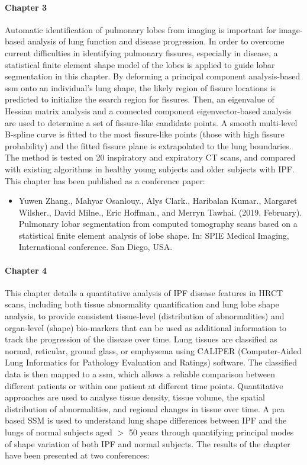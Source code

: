 \paragraph{Chapter 3} Automatic identification of pulmonary lobes from imaging is important for image-based analysis of lung function and disease progression. In order to overcome current difficulties in identifying pulmonary fissures, especially in disease, a statistical finite element shape model of the lobes is applied to guide lobar segmentation in this chapter. By deforming a principal component analysis-based \gls{ssm} onto an individual’s lung shape, the likely region of fissure locations is predicted to initialize the search region for fissures. Then, an eigenvalue of Hessian matrix analysis and a connected component eigenvector-based analysis are used to determine a set of fissure-like candidate points. A smooth multi-level B-spline curve is fitted to the most fissure-like points (those with high fissure probability) and the fitted fissure plane is extrapolated to the lung boundaries. The method is tested on 20 inspiratory and expiratory CT scans, and compared with existing algorithms in healthy young subjects and older subjects with IPF. This chapter has been published as a conference paper:

\begin{itemize}
  \item Yuwen Zhang., Mahyar Osanlouy., Alys Clark., Haribalan Kumar., Margaret Wilsher., David Milne., Eric Hoffman., and  Merryn Tawhai. (2019, February). Pulmonary lobar segmentation from computed tomography scans based on a statistical finite element analysis of lobe shape. In: SPIE Medical Imaging, International conference. San Diego, USA.
\end{itemize}

\paragraph{Chapter 4} This chapter details a quantitative analysis of IPF disease features in HRCT scans, including both tissue abnormality quantification and lung lobe shape analysis, to provide consistent tissue-level (distribution of abnormalities) and organ-level (shape) bio-markers that can be used as additional information to track the progression of the disease over time. Lung tissues are classified as normal, reticular, ground glass, or emphysema using CALIPER (Computer-Aided Lung Informatics for Pathology Evaluation and Ratings) software. The classified data is then mapped to a \gls{ssm}, which allows a reliable comparison between different patients or within one patient at different time points. Quantitative approaches are used to analyse tissue density, tissue volume, the spatial distribution of abnormalities, and regional changes in tissue over time. A \gls{pca} based SSM is used to understand lung shape differences between IPF and the lungs of normal subjects aged $>$ 50 years through quantifying principal modes of shape variation of both IPF and normal subjects. The results of the chapter have been presented at two conferences:

